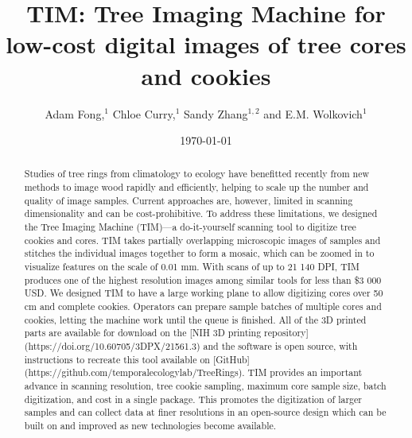 \documentclass[a4paper,12pt]{article}
\title{TIM: Tree Imaging Machine for low-cost digital images of tree cores and cookies}
\author{Adam Fong,$^{1}$ Chloe Curry,$^{1}$ Sandy Zhang$^{1,2}$ and E.M. Wolkovich$^{1}$} %
\date{\today}
\begin{document}
\maketitle


\begin{abstract}  
Studies of tree rings from climatology to ecology have benefitted recently from new methods to image wood rapidly and efficiently, helping to scale up the number and quality of image samples. Current approaches are, however, limited in scanning dimensionality and can be cost-prohibitive. %
To address these limitations, we designed the Tree Imaging Machine (TIM)---a do-it-yourself scanning tool to digitize tree cookies and cores. TIM takes partially overlapping microscopic images of samples and stitches the individual images together to form 
a mosaic, which can be zoomed in to visualize features on the scale of 0.01 mm. With scans of up to 21 140 DPI, TIM produces one of the highest resolution images among similar tools for less than \$3 000 USD. %
We designed TIM to have a large working plane to allow digitizing cores over 50 cm and complete cookies. Operators can prepare sample batches of multiple cores and cookies, letting the machine work until the queue is finished.
All of the 3D printed parts are available for download on the [NIH 3D printing repository](https://doi.org/10.60705/3DPX/21561.3) and the software is  %
open source, with instructions to recreate this tool available on [GitHub](https://github.com/temporalecologylab/TreeRings). TIM provides an important advance in scanning resolution, tree cookie sampling, maximum core sample size, batch digitization, and cost in a single package. This promotes the digitization of larger samples and can collect data at finer resolutions in an open-source design which can be built on and improved as new technologies become available. %
\end{abstract}
\end{document}
